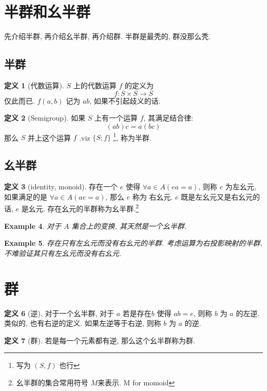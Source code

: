 \documentclass[12pt]{ctexart}
\theoremstyle{definition}
\theoremstyle{definition}
\newtheorem{definition}{定义}[section]
\theoremstyle{plain}
\newtheorem{exam}[definition]{Example}
\theoremstyle{remark}
\begin{document}
\section{半群和幺半群}\label{sec:1}
先介绍半群, 再介绍幺半群, 再介绍群. 半群是最秃的, 群没那么秃. 
\subsection{半群}



\begin{definition}[代数运算]
\(S\) 上的代数运算 \(f\) 的定义为
\begin{equation}
f \colon S \times S \to S
\end{equation}
仅此而已. \(f (a, b ) \) 记为 \(a b\), 如果不引起歧义的话.
\end{definition}

\begin{definition}[Semigroup]
如果 \(S\) 上有一个运算 \(f\), 其满足结合律:
\begin{equation}
	(ab)c = a (b c)
\end{equation}
那么 \(S\) 并上这个运算 \(f\) .viz \(\{ S ; f \}\) \footnote{写为 \((S , f )\) 也行}, 称为半群. 
\end{definition}
\subsection{幺半群}

\begin{definition}[identity, monoid]
存在一个 \(e\) 使得 \(\forall a \in A (e a = a)\), 则称 \(e\) 为左幺元, 如果满足的是 \(\forall a \in A (a e = a ) \), 那么 \(e\) 称为 右幺元. \(e\) 既是左幺元又是右幺元的话, \(e\) 是幺元. 存在幺元的半群称为幺半群.\footnote{幺半群的集合常用符号 \(M\)来表示. M for momoid}
\end{definition}
\begin{exam}
对于 \(A\) 集合上的变换, 其天然是一个幺半群. 
\end{exam}
\begin{exam}\label{eg:zuoyou}
存在只有左幺元而没有右幺元的半群. 考虑运算为右投影映射的半群, 不难验证其只有左幺元而没有右幺元.
\end{exam}

\section{群}

\begin{definition}[逆]
对于一个幺半群, 对于 \(a\) 若是存在\(b\) 使得 \(ab = e\), 则称 \(b\) 为 \(a\) 的左逆. 类似的, 也有右逆的定义. 如果左逆等于右逆, 则称 \(b\) 为 \(a\) 的逆. 
\end{definition}
\begin{definition}[群]
若是每一个元素都有逆, 那么这个幺半群称为群.
\end{definition}
\end{document}
